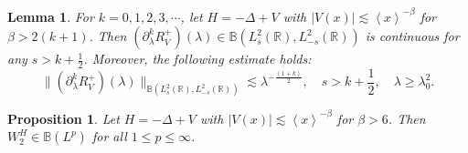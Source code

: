 \documentclass[reqno]{amsart}
\newtheorem{lemma}[definition]{Lemma}
\newtheorem{proposition}[definition]{Proposition}
\newcommand\R{\mathbb{R}}
\newcommand\B{\mathbb{B}}
\numberwithin{equation}{section}
\begin{document}
\begin{lemma}\label{lemm of RV at high energy}
For $k=0,1,2,3,\cdots$, let $H=-\Delta+V$ with $|V(x)|\lesssim \left<x\right>^{-\beta}$ for $\beta>2(k+1)$. Then $(\partial^k_{\lambda}R^{+}_V)(\lambda)\in\B(L^2_s(\R),L^2_{-s}(\R))$ is continuous for any $s>k+\frac{1}{2}$. Moreover, the following estimate holds:    
 \begin{equation*}
\big\|(\partial^k_{\lambda}R^{+}_V)(\lambda)\big\|_{\B(L^2_s(\R),L^2_{-s}(\R))} \lesssim \lambda^{-\frac{(1+k)}{2}},\quad s>k+\frac{1}{2},\quad \lambda\geq\lambda^2_0. 
 \end{equation*}
\end{lemma} 
\begin{proposition}\label{bound of W2}
Let $H=-\Delta+V$ with $|V(x)|\lesssim \left<x\right>^{-\beta}$ for $\beta>6$. Then $W^{H}_2\in\B(L^p)$ for all $1\leq p\leq\infty$.
\end{proposition}
\end{document}
